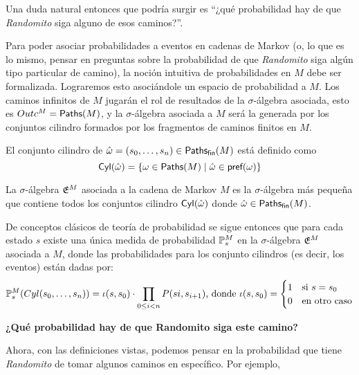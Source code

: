 Una duda natural entonces que podría surgir es ``¿qué probabilidad hay de que
\emph{Randomito} siga alguno de esos caminos?''.

Para poder asociar probabilidades a eventos en cadenas de Markov (o, lo que es
lo mismo, pensar en preguntas sobre la probabilidad de que \emph{Randomito}
siga algún tipo particular de camino), la noción intuitiva de probabilidades en
$M$ debe ser formalizada. Lograremos esto asociándole un espacio de
probabilidad a $M$. Los caminos infinitos de $M$ jugarán el rol de resultados
de la $\sigma$-álgebra asociada, esto es $Outc^M = \textsf{Paths}(M)$, y la
$\sigma$-álgebra asociada a $M$ será la generada por los conjuntos cilindro
formados por los fragmentos de caminos finitos en $M$.

\begin{definition}
	El conjunto cilindro de $\hat \omega = (s_0, \dots, s_n) \in \textsf{Paths}_\textsf{fin}(M)$ está definido como
	$$\textsf{Cyl}(\hat \omega) = \{\omega \in \textsf{Paths}(M) \mid \hat \omega \in \textsf{pref}(\omega)\}$$
\end{definition}

\begin{definition}
	La $\sigma$-álgebra $\mathfrak{E}^M$ asociada a la cadena de Markov $M$ es la $\sigma$-álgebra más pequeña que contiene todos los conjuntos cilindro $\textsf{Cyl}(\hat \omega)$ donde $\hat \omega \in \textsf{Paths}_\textsf{fin}(M)$.
\end{definition}

De conceptos clásicos de teoría de probabilidad se sigue entonces que para cada
estado $s$ existe una única medida de probabilidad $\mathbb{P}^M_{s}$ en la
$\sigma$-álgebra $\mathfrak{E}^M$ asociada a $M$, donde las probabilidades para los
conjunto cilindros (es decir, los eventos) están dadas por:
\begin{equation}
	\label{probMC}
	\mathbb{P}^M_{s}(Cyl(s_0, \dots, s_n)) = \iota(s,s_0) \cdot \prod_{0 \leq i < n} P(si, s_{i+1})\text{, donde }\iota(s,s_0) =
	\begin{cases}
		1 &\text{si } s = s_0 \\
		0 &\text{en otro caso}
	\end{cases}
\end{equation}

\textbf{¿Qué probabilidad hay de que Randomito siga este camino?}

Ahora, con las definiciones vistas, podemos pensar en la probabilidad que tiene
\emph{Randomito} de tomar algunos caminos en específico. Por ejemplo,

